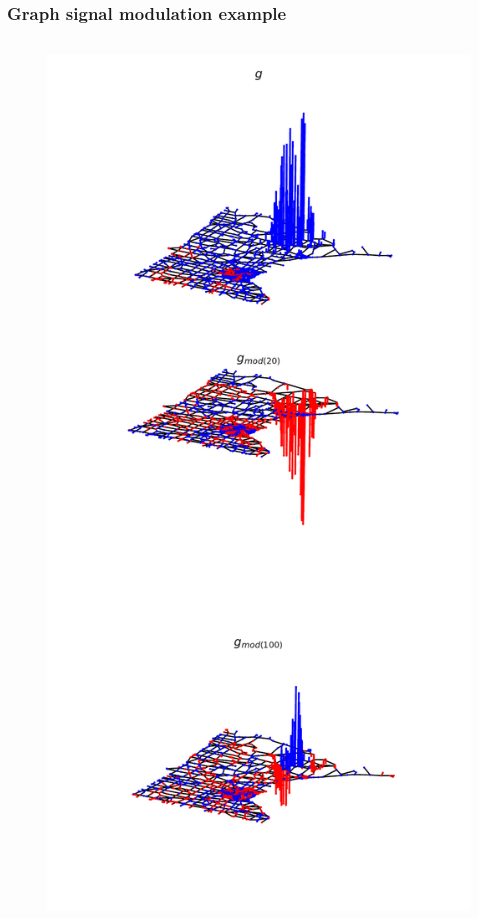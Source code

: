\documentclass{beamer}
\begin{document}
\begin{frame}
  \frametitle{Graph signal modulation example}
  \begin{columns}
    \begin{column}{0.5\textwidth}
\begin{figure}
\includegraphics[trim={0 10cm 0 0},clip,width=\linewidth]{../img/basic_operations_3.pdf}

\end{figure}
\end{column}
\end{columns}
\end{frame}
\end{document}
